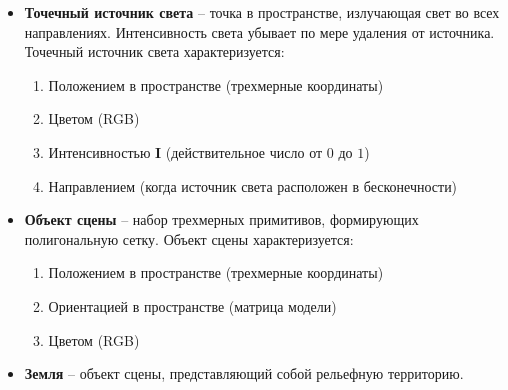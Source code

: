 \begin{itemize}
    \item \textbf{Точечный источник света} -- точка в пространстве, излучающая свет во всех направлениях. Интенсивность света убывает по мере удаления от источника. Точечный источник света характеризуется:
        \begin{enumerate}[label=(\alph*)]
            \item Положением в пространстве (трехмерные координаты)
            \item Цветом ({RGB})
            \item Интенсивностью \textbf{I} (действительное число от $0$ до $1$)
            \item Направлением (когда источник света расположен в бесконечности)
        \end{enumerate}
    \item \textbf{Объект сцены} -- набор трехмерных примитивов, формирующих полигональную сетку. Объект сцены характеризуется:
        \begin{enumerate}[label=(\alph*)]
            \item Положением в пространстве (трехмерные координаты)
            \item Ориентацией в пространстве (матрица модели)
            \item Цветом ({RGB})
        \end{enumerate}
    \item \textbf{Земля} -- {объект сцены}, представляющий собой рельефную территорию.

\end{itemize}
